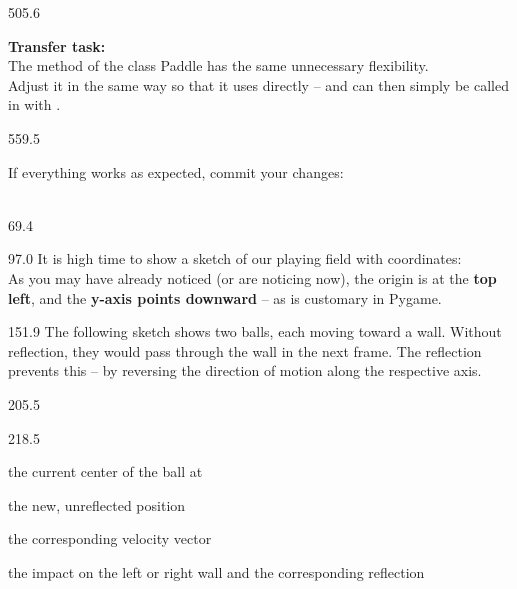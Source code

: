 \documentclass{aslab}
\begin{document}
\begin{region}[pitch=13.53]{505.6}
\begin{ntasks}[start=2]
\item \textbf{Transfer task:}\\
  The method  of the class Paddle has the same unnecessary
  flexibility.\\
  Adjust it in the same way so that it uses  directly --
  and can then simply be called in  with
  .
\end{ntasks}
\end{region}

\begin{region}[pitch=13.45]{559.5}
\begin{ntasks}[start=3]
\item If everything works as expected, commit your changes:\\
  \\
\end{ntasks}
\end{region}

\nextpage
\begin{region}{69.4}
\end{region}

\begin{region}[pitch=14.2]{97.0}
It is high time to show a sketch of our playing field with coordinates:\\
As you may have already noticed (or are noticing now), the origin is at the
\textbf{top left}, and the \textbf{y-axis points downward} -- as is customary
in Pygame.
\end{region}

\begin{region}[pitch=13.2]{151.9}
The following sketch shows two balls, each moving toward a wall. Without
reflection, they would pass through the wall in the next frame. The reflection
prevents this -- by reversing the direction of motion along the respective
axis.
\end{region}

\begin{region}{205.5}
\end{region}

\begin{region}[pitch=13.47]{218.5}
\begin{dashlist}
\item the current center of the ball at 
\item the new, unreflected position 
\item the corresponding velocity vector 
\item the impact on the left or right wall and the corresponding reflection
\end{dashlist}
\end{region}
\end{document}
